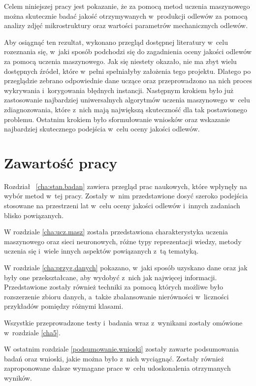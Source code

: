 Celem niniejszej pracy jest pokazanie, że za pomocą metod uczenia maszynowego można skutecznie badać jakość otrzymywanych w~produkcji odlewów za pomocą analizy zdjęć mikrostruktury oraz wartości parametrów mechanicznych odlewów. 

Aby osiągnąć ten rezultat, wykonano przegląd dostępnej literatury w~celu rozeznania się, w~jaki sposób podchodzi się do zagadnienia oceny jakości odlewów za pomocą uczenia maszynowego. Jak się niestety okazało, nie ma zbyt wielu dostępnych źródeł, które w~pełni spełniałyby założenia tego projektu. Dlatego po przeglądzie zebrano odpowiednie dane uczące oraz przeprowadzono na nich proces wykrywania i~korygowania błędnych instancji. Następnym krokiem było już zastosowanie najbardziej uniwersalnych algorytmów uczenia maszynowego w~celu zdiagnozowania, które z~nich mają największą skuteczność dla tak postawionego problemu. Ostatnim krokiem było sformułowanie wniosków oraz wskazanie najbardziej skutecznego podejścia w~celu oceny jakości odlewów.



\section{Zawartość pracy}
\label{sec:zawartosc}

Rozdział ~\ref{cha:stan.badan} zawiera przegląd prac naukowych, które wpłynęły na wybór metod w~tej pracy. Zostały w~nim przedstawione dosyć szeroko podejścia stosowane na przestrzeni lat w~celu oceny jakości odlewów i~innych zadaniach blisko powiązanych. 

W rozdziale \ref{cha:ucz.masz} została przedstawiona charakterystyka uczenia maszynowego oraz sieci neuronowych, różne typy reprezentacji wiedzy, metody uczenia się i~wiele innych aspektów powiązanych z~tą tematyką. 

W rozdziale \ref{cha:przyg.danych} pokazano, w~jaki sposób uzyskano dane oraz jak były one przekształcane, aby wydobyć z~nich jak najwięcej informacji. Przedstawione zostały również techniki za pomocą których możliwe było rozszerzenie zbioru danych, a~także zbalansowanie nierówności w~liczności przykładów pomiędzy różnymi klasami.

Wszystkie przeprowadzone testy i~badania wraz z~wynikami zostały omówione w~rozdziale \ref{cha5}. 

W ostatnim rozdziale \ref{podsumowanie.wnioski} zostały zawarte podsumowania badań oraz wnioski, jakie można było z~nich wyciągnąć. Zostały również zaproponowane dalsze wymagane prace w~celu udoskonalenia otrzymanych wyników.













